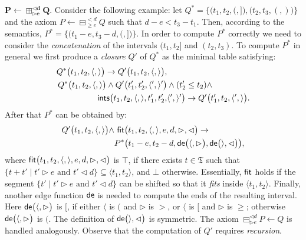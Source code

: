\documentclass{article}
\begin{document}
{{\smallskip
\noindent $\bm{P \leftarrow \boxplus^{\lhd d}_{\rhd e} Q.}$ Consider the following example: let $Q^* = \{ \bigl( t_1, t_2, (, ]\bigr), \bigl( t_2, t_3, (, )\bigr)\}$ and the axiom $P \leftarrow \boxminus^{< d}_{\geqslant e} Q$ such that $d-e < t_3 - t_1$. Then, according to the semantics, $P^* = \{ \bigl( t_1-e, t_3-d, (, ]\bigr)\}$. In order to compute $P^*$ correctly we need to consider the \emph{concatenation} of the intervals $(t_1, t_2]$ and $(t_2, t_3)$. To compute $P^*$ in general we first produce a  \emph{closure} $Q'$ of $Q^*$ as the minimal table satisfying:
%
\begin{align*}
   Q^*\bigl(t_1,  t_2, \langle , \rangle\bigr) \to Q'\bigl(t_1,  t_2, \langle , \rangle\bigr),&\\
   Q^*\bigl(t_1, t_2, \langle , \rangle\bigr) \land Q'\bigl(t_1',  t_2', \langle' , \rangle'\bigr) & \land  (t_2' \leq t_2)  \land \\
  {\sf ints}\bigl(t_1, t_2, \langle , \rangle, t_1', t_2',& \langle' , \rangle'\bigr)   \to
    Q'\bigl(t_1', t_2, \langle', \rangle\bigr).
\end{align*}
%
After that $P^*$ can be obtained by:
%
%
      \begin{align*}
  Q'\bigl(t_1, t_2, \langle , \rangle\bigr) \land &~ {\sf fit}\bigl(t_1, t_2, \langle , \rangle, e, d, \rhd, \lhd \bigr) \to \\
%
   & P^*\bigl(t_1 - e, t_2 - d, {\sf de}\bigl(\langle , \rhd\bigr), {\sf de}\bigl(\rangle, \lhd\bigr) \bigr),
\end{align*}
%
where ${\sf fit}\bigl(t_1, t_2, \langle , \rangle, e, d, \rhd, \lhd \bigr)$ is $\top$, if there exists $t \in \mathfrak{T}$ such that $\{t + t' \mid t' \rhd e\text{ and }t' \lhd d \} \subseteq \langle t_1, t_2 \rangle$, and $\bot$ otherwise. Essentially, ${\sf fit}$ holds if the segment $\{t' \mid t' \rhd e\text{ and }t' \lhd d \}$ can be shifted so that it \emph{fits} inside $\langle t_1, t_2 \rangle$. Finally, another edge function ${\sf de}$ is needed to compute the ends of the resulting interval. Here ${\sf de}\bigl(\langle , \rhd\bigr)$ is $[$, if either $\langle$ is $($ and $\rhd$ is $>$, or $\langle$ is $[$ and $\rhd$ is $\geqslant$; otherwise ${\sf de}\bigl(\langle , \rhd\bigr)$ is $($. The definition of ${\sf de}\bigl(\rangle, \lhd\bigr)$ is symmetric. The axiom $\boxminus^{\lhd d}_{\rhd e} P \leftarrow Q$ is handled analogously. Observe that the computation of $Q'$ requires \emph{recursion}.

}}
\end{document}
